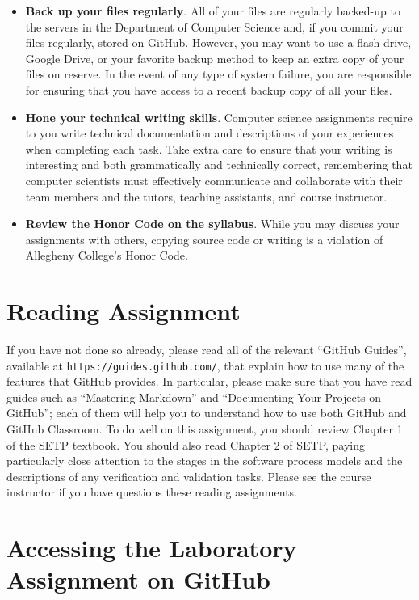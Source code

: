 \documentclass[11pt]{article}
\newcommand{\url}[1]{\lstinline{#1}}
\begin{document}
\begin{itemize}
\item {\bf Back up your files regularly}. All of your files are regularly backed-up to the servers in the Department of
  Computer Science and, if you commit your files regularly, stored on GitHub. However, you may want to use a flash
  drive, Google Drive, or your favorite backup method to keep an extra copy of your files on reserve. In the event of
  any type of system failure, you are responsible for ensuring that you have access to a recent backup copy of all your
  files.

\item {\bf Hone your technical writing skills}. Computer science assignments require to you write technical
  documentation and descriptions of your experiences when completing each task. Take extra care to ensure that your
  writing is interesting and both grammatically and technically correct, remembering that computer scientists must
  effectively communicate and collaborate with their team members and the tutors, teaching assistants, and course
  instructor.

\item {\bf Review the Honor Code on the syllabus}. While you may discuss your assignments with others, copying source
  code or writing is a violation of Allegheny College's Honor Code.

\end{itemize}

\section*{Reading Assignment}

If you have not done so already, please read all of the relevant ``GitHub Guides'', available at
\url{https://guides.github.com/}, that explain how to use many of the features that GitHub provides. In particular,
please make sure that you have read guides such as ``Mastering Markdown'' and ``Documenting Your Projects on GitHub'';
each of them will help you to understand how to use both GitHub and GitHub Classroom. To do well on this assignment, you
should review Chapter 1 of the SETP textbook. You should also read Chapter 2 of SETP, paying particularly close
attention to the stages in the software process models and the descriptions of any verification and validation tasks.
Please see the course instructor if you have questions these reading assignments.

\section*{Accessing the Laboratory Assignment on GitHub}
\end{document}
